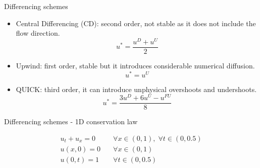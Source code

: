 \documentclass{beamer}
\begin{document}
\begin{frame}{Differencing schemes}
\begin{itemize}
	\item Central Differencing (CD): second order, not stable as it does not 
	include the flow direction.
	\begin{equation*}
	u^* = \frac{u^D + u^U}{2}
	\end{equation*}
	\item Upwind: first order, stable but it introduces considerable numerical 
	diffusion.
	\begin{equation*}
		u^* = u^U
	\end{equation*}
	\item QUICK: third order, it can introduce unphysical overshoots and 
	undershoots.
	\begin{equation*}
		u^* = \frac{3u^D + 6u^U - u^{FU}}{8}
	\end{equation*}
\end{itemize}
\end{frame}
\begin{frame}{Differencing schemes - 1D conservation law}
\vspace{-0.5cm}
\begin{align*}
	u_t + u_x = 0 \quad &\forall x \in (0, 1), \; \forall t \in (0, 0.5)\\
	u(x, 0) = 0 \quad &\forall x \in (0, 1)\\
	u(0, t) = 1 \quad &\forall t \in (0, 0.5)
\end{align*}
\vspace{-1cm}
\begin{figure}
	\centering
	
\end{figure}
\end{frame}
\end{document}
